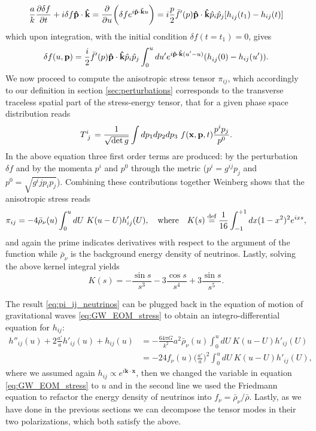 $$\frac{a}{k}\frac{\partial \delta f}{\partial t}+i\delta f \mathbf{\hat p\cdot\hat k}=\frac{\partial}{\partial u}\bigg(\delta f e^{i\mathbf{\hat p\cdot\hat k}u}\bigg)=i\frac{p}{2}\bar f'(p)\mathbf{\hat p\cdot\hat k}\hat p_i\hat p_j[\tensor{h}{_i_j}(t_1)-h_{ij}( t)]$$
which upon integration, with the initial condition $\delta f(t=t_1)=0$, gives
\begin{equation}
    \delta f(u,\mathbf p) = \frac{i}{2}\bar f'(p)\mathbf{\hat p\cdot\hat k}\hat p_i\hat p_j\int_{0}^{u}du'e^{i\mathbf{\hat p\cdot\hat k}(u'-u)}(\tensor{h}{_i_j}(0)-h_{ij}(u')).
\end{equation}
We now proceed to compute the anisotropic stress tensor $\pi_{ij}$, which accordingly to our definition in section \ref{sec:perturbations} corresponds to the transverse traceless spatial part of the stress-energy tensor, that for a given phase space distribution reads
\begin{align*}
    \tensor{T}{^i_j}=\frac{1}{\sqrt{\det g}}\int dp_1dp_2dp_3\ f(\mathbf x,\mathbf p,t)\frac{p^ip_j}{p^0}.
\end{align*}
In the above equation three first order terms are produced: by the perturbation $\delta f$ and by the momenta $p^i$ and $p^0$ through the metric ($p^i=g^{ij}p_j$ and $p^0=\sqrt{g^ijp_ip_j}$). Combining these contributions together Weinberg shows that the anisotropic stress reads
\begin{equation}
    \pi_{ij}=-4\bar\rho_\nu(u)\int_0^u dU\ K(u-U)h'_{ij}(U),\quad \text{where}\quad K(s)\defeq\frac{1}{16}\int_{-1}^{+1}dx(1-x^2)^2e^{ixs},\label{eq:pi_ij_neutrinos}
\end{equation}
and again the prime indicates derivatives with respect to the argument of the function while $\bar\rho_\nu$ is the background energy density of neutrinos. Lastly, solving the above kernel integral yields
\begin{equation*}
    K(s)=-\frac{\sin s}{s^3}-3\frac{\cos s}{s^4}+3\frac{\sin s}{s^5}.
\end{equation*}

The result \eqref{eq:pi_ij_neutrinos} can be plugged back in the equation of motion of gravitational waves \eqref{eq:GW_EOM_stress} to obtain an integro-differential equation for $h_{ij}$: 
\begin{align}
    h''_{ij}(u)+2\frac{a'}{a}h'_{ij}(u)+ h_{ij}(u)&=-\frac{64\pi G}{k^2} a^2\bar\rho_\nu(u)\int_0^u dU\ K(u-U)h'_{ij}(U)\nonumber\\
    &=-24f_\nu(u)\bigg(\frac{a'}{a}\bigg)^2\int_0^u dU\ K(u-U)h'_{ij}(U),\label{eq:GW_EOM_neutrinos}
\end{align}
where we assumed again $h_{ij}\propto e^{i\mathbf{k\cdot x}}$, then we changed the variable in equation \eqref{eq:GW_EOM_stress} to $u$ and in the second line we used the Friedmann equation to refactor the energy density of neutrinos into $f_\nu= \bar\rho_\nu/\bar\rho$. Lastly, as we have done in the previous sections we can decompose the tensor modes in their two polarizations, which both satisfy the above. 

